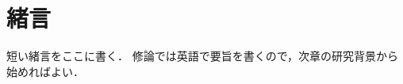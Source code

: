 \chapter{緒言}
\label{chap:Introdunction}

\begin{tcolorbox}
  短い緒言をここに書く．
  修論では英語で要旨を書くので，次章の研究背景から始めればよい．
\end{tcolorbox}

\textcolor{LightGray}{
}
